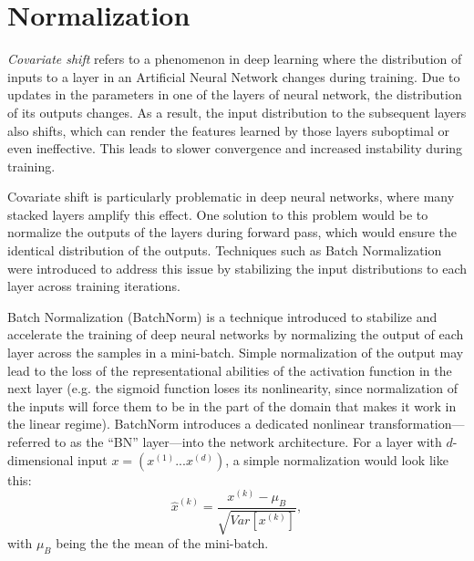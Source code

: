 \section{Normalization}
\label{subsec:normalization}

\begin{definition}
  \textit{Covariate shift} \autocite{ioffe2015batch} refers to a phenomenon in deep learning where the distribution of inputs to a layer in an Artificial Neural Network changes during training. Due to updates in the parameters in one of the layers of neural network, the distribution of its outputs changes. As a result, the input distribution to the subsequent layers also shifts, which can render the features learned by those layers suboptimal or even ineffective. This leads to slower convergence and increased instability during training.
\end{definition}

Covariate shift is particularly problematic in deep neural networks, where many stacked layers amplify this effect. One solution to this problem would be to normalize the outputs of the layers during forward pass, which would ensure the identical distribution of the outputs. Techniques such as Batch Normalization \autocite{ioffe2015batch} were introduced to address this issue by stabilizing the input distributions to each layer across training iterations.

Batch Normalization (BatchNorm) \autocite{ioffe2015batch} is a technique introduced to stabilize and accelerate the training of deep neural networks by normalizing the output of each layer across the samples in a mini-batch. Simple normalization of the output may lead to the loss of the representational abilities of the activation function in the next layer (e.g. the sigmoid function loses its nonlinearity, since normalization of the inputs will force them to be in the part of the domain that makes it work in the linear regime). BatchNorm introduces a dedicated nonlinear transformation—referred to as the “BN” layer—into the network architecture. For a layer with $d$-dimensional input $x = (x^{(1)}...x^{(d)})$, a simple normalization would look like this:
\[
  \hat{x}^{(k)} = \frac{x^{(k)} - \mu_B}{\sqrt{Var[x^{(k)}]}},
\]
with $\mu_B$ being the the mean of the mini-batch.


